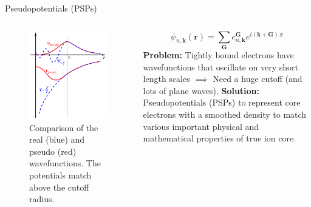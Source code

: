 \documentclass[aspectratio=169]{beamer}
\let \vec \mathbf
\begin{document}
\begin{frame}{Pseudopotentials (PSPs)}
\begin{columns}


\begin{figure}
    \centering
    \includegraphics[width=0.6\linewidth]{lectures/figures/7_Pseudopotentials.png}
    \caption{Comparison of the real (blue) and pseudo (red) wavefunctions. The potentials match above the cutoff radius.}
\end{figure} 

\begin{equation*}
\psi_{n,\vec{k}}(\vec{r}) = \sum_{\vec{G}} c^{\vec{G}}_{n,\vec{k}} e^{i(\vec{k}+\vec{G}).\vec{r}}
\end{equation*} 
\textbf{Problem: }Tightly bound electrons have wavefunctions that oscillate on very short length scales $\implies$ Need a huge cutoff (and lots of plane waves).\newline
\newline
\textbf{Solution:} Pseudopotentials (PSPs) to represent core electrons with a smoothed density to match various important physical and mathematical properties of true ion core.

\end{columns} 
\end{frame} 
\end{document}
